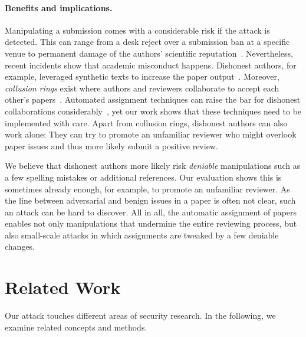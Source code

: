 \documentclass[letterpaper,twocolumn,10pt]{article}
\begin{document}
\paragraph{Benefits and implications.}
Manipulating a submission comes with a considerable risk if the attack is detected. This can range from a {desk\EndAccSupp{}} reject over a submission ban at a specific venue to permanent damage of the authors' scientific reputation~\cite{shah-22-challenges}. 
Nevertheless, recent incidents show that academic misconduct happens. {Dishonest\EndAccSupp{}} authors, for example, leveraged synthetic texts to increase the paper output~\cite{cabanac-21-tortured}. Moreover, \emph{collusion rings} exist where authors and reviewers collaborate to accept each other's papers~\cite{littman-21-collusion}. 
Automated assignment techniques can raise the bar for {dishonest\EndAccSupp{}} collaborations considerably~\cite{leyton-22-matching}, yet our work shows that these techniques need to be implemented with care. 
Apart from {collusion\EndAccSupp{}} rings, {dishonest\EndAccSupp{}} authors can also work alone: They can try to promote an {unfamiliar\EndAccSupp{}} reviewer who might {overlook\EndAccSupp{}} paper issues and thus more likely submit a positive review. 

We believe that {dishonest\EndAccSupp{}} authors more likely risk \emph{deniable} manipulations such as a few spelling mistakes or additional references. Our evaluation shows this is sometimes already enough, for example, to promote an {unfamiliar\EndAccSupp{}} reviewer.
As the line between adversarial and benign issues in a paper is often not clear, such an attack can be hard to discover.
All in all, the automatic assignment of papers enables not only manipulations that {undermine\EndAccSupp{}} the entire reviewing process, but also small-scale attacks in which assignments are tweaked by a few deniable changes.  \section{Related Work}
\label{sec:related}

Our attack touches different areas of security research. In the following, we examine related concepts and methods.
\end{document}
